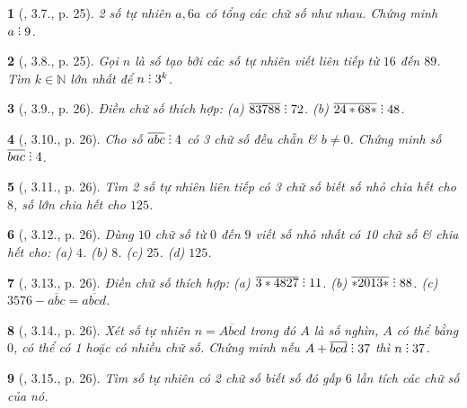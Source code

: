\documentclass{article}
\newtheorem{baitoan}{}
\DeclareRobustCommand{\divby}{%
	\mathrel{\vbox{\baselineskip.65ex\lineskiplimit0pt\hbox{.}\hbox{.}\hbox{.}}}%
}
\begin{document}
\begin{baitoan}[\cite{TLCT_THCS_Toan_6_so_hoc}, 3.7., p. 25]
	2 số tự nhiên $a,6a$ có tổng các chữ số như nhau. Chứng minh $a\divby9$.
\end{baitoan}

\begin{baitoan}[\cite{TLCT_THCS_Toan_6_so_hoc}, 3.8., p. 25]
	Gọi $n$ là số tạo bởi các số tự nhiên viết liên tiếp từ $16$ đến $89$. Tìm $k\in\mathbb{N}$ lớn nhất để $n\divby3^k$.
\end{baitoan}

\begin{baitoan}[\cite{TLCT_THCS_Toan_6_so_hoc}, 3.9., p. 26]
	Điền chữ số thích hợp: (a) $\overline{83788}\divby72$. (b) $\overline{24*68*}\divby48$.
\end{baitoan}

\begin{baitoan}[\cite{TLCT_THCS_Toan_6_so_hoc}, 3.10., p. 26]
	Cho số $\overline{abc}\divby4$ có 3 chữ số đều chẵn \& $b\ne0$. Chứng minh số $\overline{bac}\divby4$.
\end{baitoan}

\begin{baitoan}[\cite{TLCT_THCS_Toan_6_so_hoc}, 3.11., p. 26]
	Tìm 2 số tự nhiên liên tiếp có 3 chữ số biết số nhỏ chia hết cho $8$, số lớn chia hết cho $125$.
\end{baitoan}

\begin{baitoan}[\cite{TLCT_THCS_Toan_6_so_hoc}, 3.12., p. 26]
	Dùng $10$ chữ số từ $0$ đến $9$ viết số nhỏ nhất có 10 chữ số \& chia hết cho: (a) $4$. (b) $8$. (c) $25$. (d) $125$.
\end{baitoan}

\begin{baitoan}[\cite{TLCT_THCS_Toan_6_so_hoc}, 3.13., p. 26]
	Điền chữ số thích hợp: (a) $\overline{3*4827}\divby11$. (b) $\overline{*2013*}\divby88$. (c) $3576 - \overline{abc} = \overline{abcd}$.
\end{baitoan}

\begin{baitoan}[\cite{TLCT_THCS_Toan_6_so_hoc}, 3.14., p. 26]
	Xét số tự nhiên $n = \overline{Abcd}$ trong đó $A$ là số nghìn, $A$ có thể bằng $0$, có thể có 1 hoặc có nhiều chữ số. Chứng minh nếu $A + \overline{bcd}\divby37$ thì $n\divby37$.
\end{baitoan}

\begin{baitoan}[\cite{TLCT_THCS_Toan_6_so_hoc}, 3.15., p. 26]
	Tìm số tự nhiên có 2 chữ số biết số đó gấp $6$ lần tích các chữ số của nó.
\end{baitoan}
\end{document}
